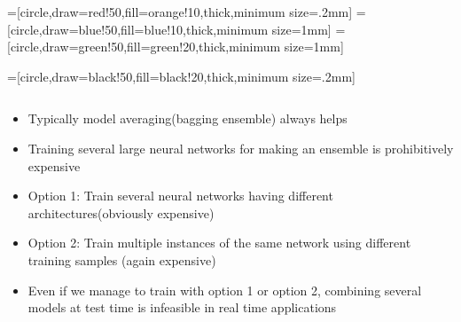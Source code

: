 \begin{frame}
	=[circle,draw=red!50,fill=orange!10,thick,minimum size=.2mm]
	=[circle,draw=blue!50,fill=blue!10,thick,minimum size=1mm]
	=[circle,draw=green!50,fill=green!20,thick,minimum size=1mm]
					
	=[circle,draw=black!50,fill=black!20,thick,minimum size=.2mm]
	\begin{columns}
		\begin{overlayarea}{\textwidth}{\textheight}
			\begin{itemize}
				\justifying
				\item<1->  Typically model averaging(bagging ensemble) always helps
				\item<2-> Training several large neural networks for making an ensemble is prohibitively expensive
				\item<3->  Option 1: Train several neural networks having different architectures(obviously expensive)
				\item<4->  Option 2: Train multiple instances of the same network using different training samples (again expensive)
				\item<5->  Even if we manage to train with option 1 or option 2, combining several models at test time is infeasible in real time applications
			\end{itemize}
		\end{overlayarea}
	\end{columns}
\end{frame}
				
